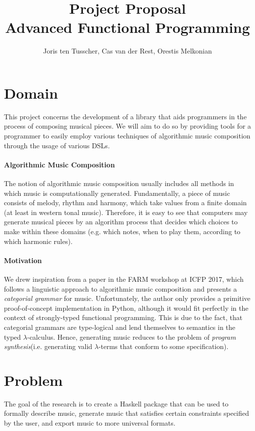 \documentclass[11pt,a4paper]{article}
\title{\textbf{Project Proposal \\ \small{Advanced Functional Programming}}}
\author{\small{Joris ten Tusscher, Cas van der Rest, Orestis Melkonian}}
\date{}
\begin{document}
\maketitle
\vspace{-50pt}

\section{Domain}
This project concerns the development of a library that aids programmers in the process of composing musical pieces. We will aim to do so by providing tools for a programmer to easily employ various techniques of algorithmic music composition through the usage of various DSLs.\vspace{-10pt}
\paragraph{Algorithmic Music Composition}
The notion of algorithmic music composition usually includes all methods in which music is computationally generated. Fundamentally, a piece of music consists of melody, rhythm and harmony, which take values from a finite domain (at least in western tonal music). Therefore, it is easy to see that computers may generate musical pieces by an algorithm process that decides which choices to make within these domains (e.g. which notes, when to play them, according to which harmonic rules).
\vspace{-10pt}
\paragraph{Motivation}
We drew inspiration from a paper in the FARM workshop at ICFP 2017, which follows a linguistic approach to algorithmic music composition and presents a \textit{categorial grammar} for music\cite{categorial}. Unfortunately, the author only provides a primitive proof-of-concept implementation in Python, although it would fit perfectly in the context of strongly-typed functional programming. This is due to the fact, that categorial grammars are type-logical and lend themselves to semantics in the typed $\lambda$-calculus\cite{moortgat}. Hence, generating music reduces to the problem of \textit{program synthesis}(i.e. generating valid $\lambda$-terms that conform to some specification).

\section{Problem}
The goal of the research is to create a Haskell package that can be used to formally describe music, generate music that satisfies certain constraints specified by the user, and export music to more universal formats.
\end{document}
